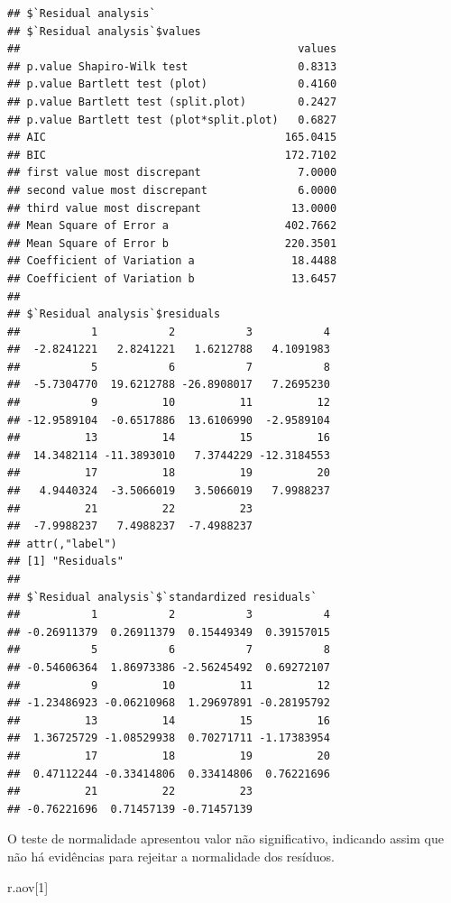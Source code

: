 \documentclass[
]{article}
\newenvironment{Shaded}{\begin{snugshade}}{\end{snugshade}}
\newcommand{\DecValTok}[1]{\textcolor[rgb]{0.00,0.00,0.81}{#1}}
\newcommand{\NormalTok}[1]{#1}
\begin{document}
\begin{verbatim}
## $`Residual analysis`
## $`Residual analysis`$values
##                                           values
## p.value Shapiro-Wilk test                 0.8313
## p.value Bartlett test (plot)              0.4160
## p.value Bartlett test (split.plot)        0.2427
## p.value Bartlett test (plot*split.plot)   0.6827
## AIC                                     165.0415
## BIC                                     172.7102
## first value most discrepant               7.0000
## second value most discrepant              6.0000
## third value most discrepant              13.0000
## Mean Square of Error a                  402.7662
## Mean Square of Error b                  220.3501
## Coefficient of Variation a               18.4488
## Coefficient of Variation b               13.6457
## 
## $`Residual analysis`$residuals
##           1           2           3           4 
##  -2.8241221   2.8241221   1.6212788   4.1091983 
##           5           6           7           8 
##  -5.7304770  19.6212788 -26.8908017   7.2695230 
##           9          10          11          12 
## -12.9589104  -0.6517886  13.6106990  -2.9589104 
##          13          14          15          16 
##  14.3482114 -11.3893010   7.3744229 -12.3184553 
##          17          18          19          20 
##   4.9440324  -3.5066019   3.5066019   7.9988237 
##          21          22          23 
##  -7.9988237   7.4988237  -7.4988237 
## attr(,"label")
## [1] "Residuals"
## 
## $`Residual analysis`$`standardized residuals`
##           1           2           3           4 
## -0.26911379  0.26911379  0.15449349  0.39157015 
##           5           6           7           8 
## -0.54606364  1.86973386 -2.56245492  0.69272107 
##           9          10          11          12 
## -1.23486923 -0.06210968  1.29697891 -0.28195792 
##          13          14          15          16 
##  1.36725729 -1.08529938  0.70271711 -1.17383954 
##          17          18          19          20 
##  0.47112244 -0.33414806  0.33414806  0.76221696 
##          21          22          23 
## -0.76221696  0.71457139 -0.71457139
\end{verbatim}

O teste de normalidade apresentou valor não significativo, indicando assim que não há evidências para rejeitar a normalidade dos resíduos.

\begin{Shaded}
\begin{Highlighting}[]
\NormalTok{r.aov[}\DecValTok{1}\NormalTok{]}
\end{Highlighting}
\end{Shaded}
\end{document}
